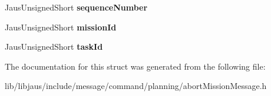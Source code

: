 \begin{DoxyCompactItemize}
\item 
\hypertarget{struct_abort_mission_message_struct_ac3d1d0c7d61e18d5869740c294370296}{\-Jaus\-Unsigned\-Short {\bfseries sequence\-Number}}\label{struct_abort_mission_message_struct_ac3d1d0c7d61e18d5869740c294370296}

\item 
\hypertarget{struct_abort_mission_message_struct_a91e493f368e8f2eb5bfa252f58f819bb}{\-Jaus\-Unsigned\-Short {\bfseries mission\-Id}}\label{struct_abort_mission_message_struct_a91e493f368e8f2eb5bfa252f58f819bb}

\item 
\hypertarget{struct_abort_mission_message_struct_ac79ed0c81a0a74309ce48eb046d98714}{\-Jaus\-Unsigned\-Short {\bfseries task\-Id}}\label{struct_abort_mission_message_struct_ac79ed0c81a0a74309ce48eb046d98714}

\end{DoxyCompactItemize}


\-The documentation for this struct was generated from the following file\-:\begin{DoxyCompactItemize}
\item 
lib/libjaus/include/message/command/planning/abort\-Mission\-Message.\-h\end{DoxyCompactItemize}
